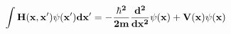 %
%
\pagestyle{empty}


       \begin{displaymath}
       \bf  %
       \int H(x,x')\psi(x')dx' = -\frac{\hbar^2}{2m}\frac{d^2}{dx^2}
                                 \psi(x)+V(x)\psi(x)
       \end{displaymath}


